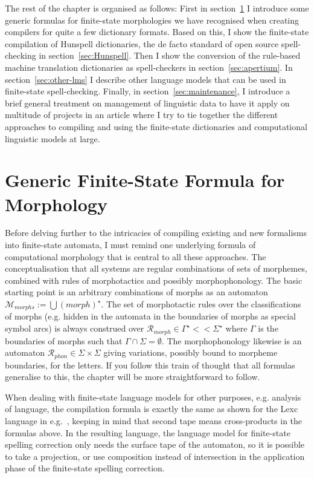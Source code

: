 \documentclass[officiallayout]{unihelcompling}
\begin{document}
The rest of the chapter is organised as follows: First in
section~\ref{sec:generic} I introduce some generic formulas for finite-state
morphologies we have recognised when creating compilers for quite a few
dictionary formats. Based on this, I show the finite-state compilation of
Hunspell dictionaries, the de facto standard of open source spell-checking in
section~\ref{sec:Hunspell}.  Then I show the conversion of the rule-based
machine translation dictionaries as spell-checkers in
section~\ref{sec:apertium}. In section~\ref{sec:other-lms} I describe other
language models that can be used in finite-state spell-checking. Finally, in
section~\ref{sec:maintenance}, I introduce a brief general treatment on
management of linguistic data to have it apply on multitude of projects in an
article where I try to tie together the different approaches to compiling and
using the finite-state dictionaries and computational linguistic models at
large.

\section{Generic Finite-State Formula for Morphology}
\label{sec:generic}

Before delving further to the intricacies of compiling existing and new
formalisms into finite-state automata, I must remind one underlying formula of
computational morphology that is central to all these approaches. The
conceptualisation that all systems are regular combinations of sets of
morphemes, combined with rules of morphotactics and possibly morphophonology.
The basic starting point is an arbitrary combinations of morphs as an automaton
$\mathcal{M}_{morphs} := \bigcup ({morph})^\star$. The set of morphotactic
rules over the classifications of morphs (e.g. hidden in the automata in the
boundaries of morphs as special symbol arcs) is always construed over
$\mathcal{R}_{morph} \in \Gamma^\star << \Sigma^\star$ where $\Gamma$ is the
boundaries of morphs such that $\Gamma \cap \Sigma = \emptyset$. The
morphophonology likewise is an automaton $\mathcal{R}_{phon} \in \Sigma \times
\Sigma$ giving variations, possibly bound to morpheme boundaries, for the
letters. If you follow this train of thought that all formulas generalise to
this, the chapter will be more straightforward to follow.

When dealing with finite-state language models for other purposes, e.g.
analysis of language, the compilation formula is exactly the same as shown for
the Lexc language in e.g.~\citet{linden2009hfst}, keeping in mind that second
tape means cross-products in the formulas above. In the resulting language, the
language model for finite-state spelling correction only needs the surface tape
of the automaton, so it is possible to take a projection, or use composition
instead of intersection in the application phase of the finite-state
spelling correction.
\end{document}
